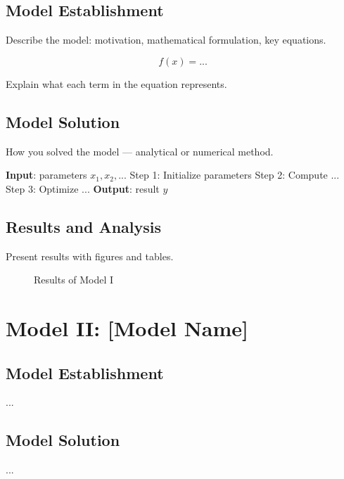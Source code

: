 \documentclass[12pt]{article}
\begin{document}
\subsection{Model Establishment}

Describe the model: motivation, mathematical formulation, key equations.

\begin{equation}
    \label{eq:model1}
    f(x) = ...
\end{equation}

Explain what each term in the equation represents.

\subsection{Model Solution}

How you solved the model — analytical or numerical method.

\begin{algorithm}[H]
\caption{Algorithm for solving Model I}
\begin{algorithmic}[1]
\State \textbf{Input}: parameters $x_1, x_2, ...$
\State Step 1: Initialize parameters
\State Step 2: Compute ...
\State Step 3: Optimize ...
\State \textbf{Output}: result $y$
\end{algorithmic}
\end{algorithm}

\subsection{Results and Analysis}

Present results with figures and tables.

\begin{figure}[H]
    \centering
    \caption{Results of Model I}
    \label{fig:result1}
\end{figure}

\section{Model II: [Model Name]}

\subsection{Model Establishment}
...

\subsection{Model Solution}
...
\end{document}
